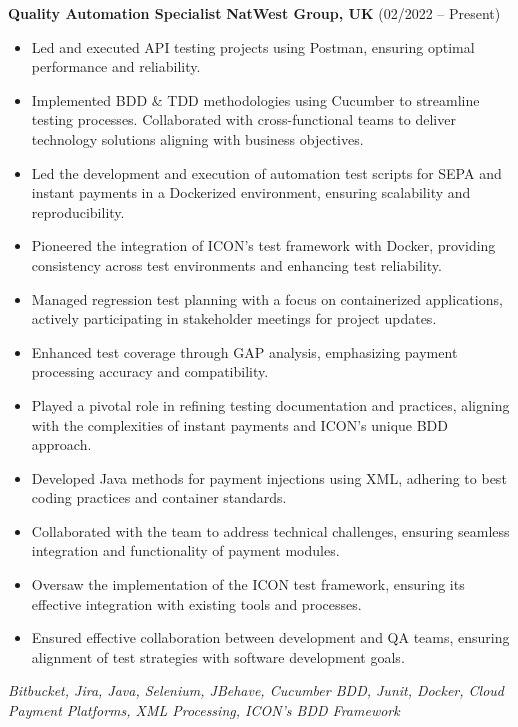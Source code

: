\documentclass[11pt,a4paper]{article}
\begin{document}
    \noindent \textbf{Quality Automation Specialist} \hfill \textbf{NatWest Group, UK}  (02/2022 – Present) \\
    \begin{itemize}
        \item Led and executed API testing projects using Postman, ensuring optimal performance and reliability.
        \item Implemented BDD & TDD methodologies using Cucumber to streamline testing processes. Collaborated with cross-functional teams to deliver technology solutions aligning with business objectives.
        \item Led the development and execution of automation test scripts for SEPA and instant payments in a Dockerized environment, ensuring scalability and reproducibility.
        \item Pioneered the integration of ICON's test framework with Docker, providing consistency across test environments and enhancing test reliability.
        \item Managed regression test planning with a focus on containerized applications, actively participating in stakeholder meetings for project updates.
        \item Enhanced test coverage through GAP analysis, emphasizing payment processing accuracy and compatibility.
        \item Played a pivotal role in refining testing documentation and practices, aligning with the complexities of instant payments and ICON's unique BDD approach.
        \item Developed Java methods for payment injections using XML, adhering to best coding practices and container standards.
        \item Collaborated with the team to address technical challenges, ensuring seamless integration and functionality of payment modules.
        \item Oversaw the implementation of the ICON test framework, ensuring its effective integration with existing tools and processes.
        \item Ensured effective collaboration between development and QA teams, ensuring alignment of test strategies with software development goals.
    \end{itemize}
    \small \textit{Bitbucket, Jira, Java, Selenium, JBehave, Cucumber BDD, Junit, Docker, Cloud Payment Platforms, XML Processing, ICON's BDD Framework}
\end{document}
